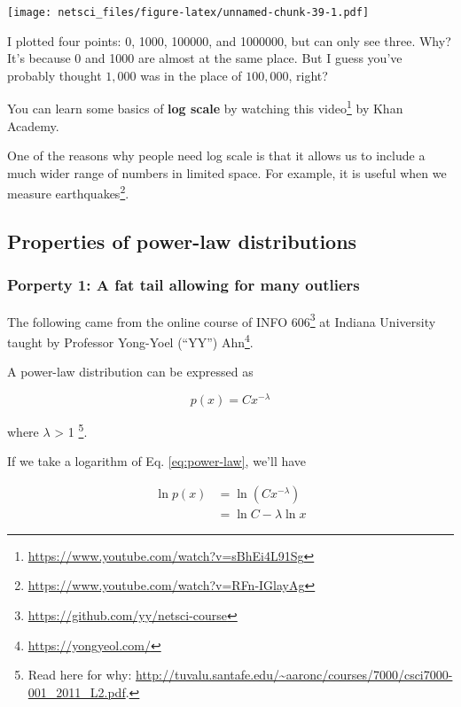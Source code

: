 \documentclass[
]{krantz}
\makeatletter
\renewcommand{\href}[2]{#2\footnote{\url{#1}}}
\newenvironment{kframe}{%
\medskip{}
\setlength{\fboxsep}{.8em}
 \def\at@end@of@kframe{}%
 \ifinner\ifhmode%
  \def\at@end@of@kframe{\end{minipage}}%
  \begin{minipage}{\columnwidth}%
 \fi\fi%
 \def\FrameCommand##1{\hskip\@totalleftmargin \hskip-\fboxsep
 \colorbox{shadecolor}{##1}\hskip-\fboxsep
     \hskip-\linewidth \hskip-\@totalleftmargin \hskip\columnwidth}%
 \MakeFramed {\advance\hsize-\width
   \@totalleftmargin\z@ \linewidth\hsize
   \@setminipage}}%
 {\par\unskip\endMakeFramed%
 \at@end@of@kframe}
\newenvironment{rmdblock}[1]
  {
  \begin{itemize}
  \renewcommand{\labelitemi}{
    \raisebox{-.7\height}[0pt][0pt]{
      {\setkeys{Gin}{width=3em,keepaspectratio}\texttt{[image: images/\#1]}}
    }
  }
  \setlength{\fboxsep}{1em}
  \begin{kframe}
  \item
  }
  {
  \end{kframe}
  \end{itemize}
  }
\newenvironment{rmdnote}
  {\begin{rmdblock}{note}}
  {\end{rmdblock}}
\makeatother
\begin{document}
\texttt{[image: netsci\_files/figure-latex/unnamed-chunk-39-1.pdf]}

I plotted four points: 0, 1000, 100000, and 1000000, but can only see three. Why? It's because 0 and 1000 are almost at the same place. But I guess you've probably thought \(1,000\) was in the place of \(100,000\), right?

You can learn some basics of \textbf{log scale} by watching \href{https://www.youtube.com/watch?v=sBhEi4L91Sg}{this video} by Khan Academy.

One of the reasons why people need log scale is that it allows us to include a much wider range of numbers in limited space. For example, it is useful \href{https://www.youtube.com/watch?v=RFn-IGlayAg}{when we measure earthquakes}.

\hypertarget{properties-of-power-law-distributions}{%
\subsection{Properties of power-law distributions}\label{properties-of-power-law-distributions}}

\hypertarget{porperty-1-a-fat-tail-allowing-for-many-outliers}{%
\subsubsection{Porperty 1: A fat tail allowing for many outliers}\label{porperty-1-a-fat-tail-allowing-for-many-outliers}}

\begin{rmdnote}
The following came from the online course of \href{https://github.com/yy/netsci-course}{INFO 606} at Indiana University taught by Professor \href{https://yongyeol.com/}{Yong-Yoel (``YY'') Ahn}.
\end{rmdnote}

A power-law distribution can be expressed as

\begin{equation} 
  p(x) = Cx^{-\lambda} \label{eq:power-law}
\end{equation}

where \(\lambda\) \textgreater{} 1 \footnote{Read here for why: \url{http://tuvalu.santafe.edu/~aaronc/courses/7000/csci7000-001_2011_L2.pdf}.}.

If we take a logarithm of Eq. \eqref{eq:power-law}, we'll have

\begin{align} 
  \ln p(x) & =  \ln (Cx^{-\lambda}) \\
  & = \ln C -\lambda \ln x \label{eq:power-law-simplified}
\end{align}
\end{document}
